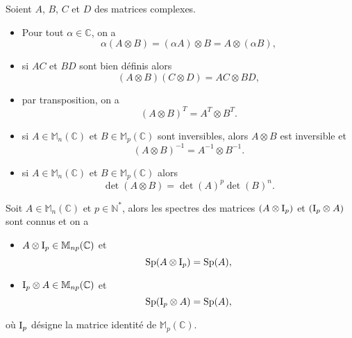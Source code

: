 \begin{proposition}
Soient $A$, $B$, $C$ et $D$ des matrices complexes.
\begin{itemize}
\item Pour tout $\alpha \in \mathbb{C}$, on a
\begin{equation}
\alpha ( A \otimes B ) = (\alpha A) \otimes B = A \otimes (\alpha B),
\end{equation}

\item si $AC$ et $BD$ sont bien définis alors
\begin{equation}
(A \otimes B ) (C \otimes D) = AC \otimes BD,
\end{equation} 

\item par transposition, on a
\begin{equation}
(A \otimes B)^{T} = A^{T} \otimes B^{T}.
\end{equation}

\item si $A \in \mathbb{M}_n (\mathbb{C})$ et $B \in \mathbb{M}_p (\mathbb{C})$ sont inversibles, alors $A \otimes B$ est inversible et
\begin{equation}
(A \otimes B)^{-1} = A^{-1} \otimes B^{-1}.
\end{equation}

\item si $A \in \mathbb{M}_n (\mathbb{C})$ et $B \in \mathbb{M}_p (\mathbb{C})$ alors
\begin{equation}
\det (A \otimes B) = \det(A)^p \det(B)^n.
\end{equation}
\end{itemize}
\label{prop:pdt_kron}
\end{proposition}

\begin{proposition}
Soit $A \in \mathbb{M}_n(\mathbb{C})$ et $p \in \mathbb{N}^*$, alors les spectres des matrices $(A \otimes \text{I}_p)$ et $(\text{I}_p \otimes A)$ sont connus et on a
\begin{itemize}
\item $A \otimes \text{I}_p \in \mathbb{M}_{np}(\mathbb{C})$ et
\begin{equation}
\text{Sp}(A \otimes \text{I}_p) = \text{Sp}(A),
\end{equation}

\item $\text{I}_p \otimes A \in \mathbb{M}_{np}(\mathbb{C})$ et
\begin{equation}
\text{Sp}(\text{I}_p \otimes A) = \text{Sp}(A),
\end{equation}
\end{itemize}
où $\text{I}_p$ désigne la matrice identité de $\mathbb{M}_p(\mathbb{C})$.
\label{prop:eigen_pdtkron}
\end{proposition}

